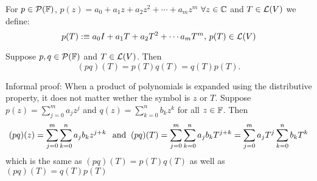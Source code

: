\begin{mydef}
  For $p \in \mathcal{P} (\mathbb{F})$, $p(z) = a_0+a_1z+a_2z^2+\cdots+a_mz^m$
  $\forall z \in \mathbb{C}$ and
  $T \in \mathcal{L} (V)$ we define: 
  \begin{equation}
    p(T) :\equiv a_0 I + a_1 T + a_2 T^2 + \cdots a_m T^m,$ $p(T) \in \linmap(V)
  \end{equation}
\end{mydef}



\setcounter{thm}{16}
\begin{thm} 
  \label{multiplicative-properties}
  Suppose $p,q \in \mathcal{P} (\mathbb{F})$ and $T\in \mathcal{L} (V)$. Then \begin{equation}
    (p q)(T) = p(T) q(T) = q(T)p(T).
  \end{equation}
\end{thm}
\begin{prf} Informal proof: When a product of polynomials is expanded using the distributive property, it does not matter wether the symbol is $z$ or $T$. Suppose $p(z) = \sum_{j=0}^{m} a_j z^j$ and $q(z)=\sum_{k=0}^{n} b_k z^k$ for all $z \in \mathbb{F}$. Then 
  \begin{equation}
    (pq)(z) = \sum_{j=0}^{m} \sum_{k=0}^{n} a_j b_k z^{j+k} \;\;\, \text{and}\;\;
    (pq)(T) = \sum_{j=0}^{m} \sum_{k=0}^{n} a_j b_k T^{j+k}
            = \sum_{j=0}^{m} a_j T^j \sum_{k=0}^{n}  b_k T^k
  \end{equation}
  which is the same as $(pq)(T) = p(T)q(T)$ as well as $(pq)(T) = q(T)p(T)$
  
\end{prf}

